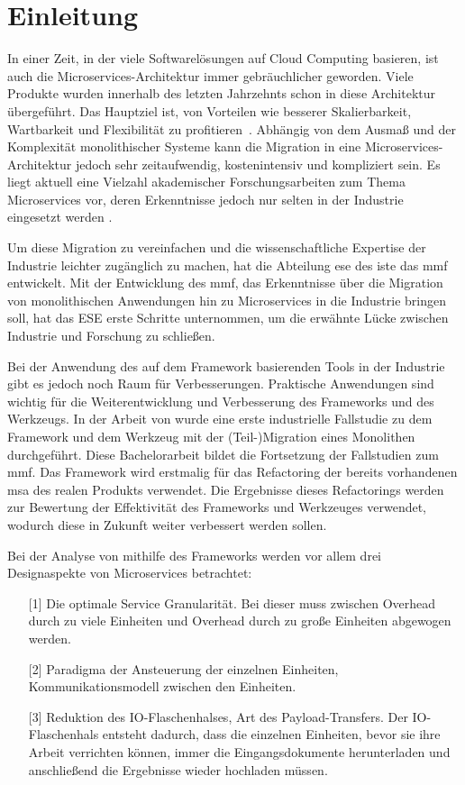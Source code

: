 \chapter{Einleitung}
\label{chap:einleitung}

In einer Zeit, in der viele Softwarelösungen auf Cloud Computing basieren, ist auch die Mi\-cro\-services-Architektur immer gebräuchlicher geworden.
Viele Produkte wurden innerhalb des letzten Jahrzehnts schon in diese Architektur übergeführt.
Das Hauptziel ist, von Vorteilen wie besserer Skalierbarkeit, Wartbarkeit und Flexibilität zu profitieren~\cite{Fritzsch_2019,taibi2017processmotivations}.
Abhängig von dem Ausmaß und der Komplexität monolithischer Systeme kann die Migration in eine Microservices-Architektur jedoch sehr zeitaufwendig, kostenintensiv und kompliziert sein.
Es liegt aktuell eine Vielzahl akademischer Forschungsarbeiten zum Thema Microservices vor, deren Erkenntnisse jedoch nur selten in der Industrie eingesetzt werden \cite{fritzsch2022architecturecentric}.

Um diese Migration zu vereinfachen und die wissenschaftliche Expertise der Industrie leichter zugänglich zu machen, hat die Abteilung \gls{ese} des \gls{iste} das \gls{mmf} entwickelt.
Mit der Entwicklung des \gls{mmf}, das Erkenntnisse über die Migration von monolithischen Anwendungen hin zu Microservices in die Industrie bringen soll, hat das ESE erste Schritte unternommen, um die erwähnte Lücke zwischen Industrie und Forschung zu schließen.

Bei der Anwendung des auf dem Framework basierenden Tools in der Industrie gibt es jedoch noch Raum für Verbesserungen.
Praktische Anwendungen sind wichtig für die Weiterentwicklung und Verbesserung des Frameworks und des Werkzeugs.
In der Arbeit von  wurde eine erste industrielle Fallstudie zu dem Framework und dem Werkzeug mit der (Teil-)Migration eines Monolithen durchgeführt.
Diese Bachelorarbeit bildet die Fortsetzung der Fallstudien zum \gls{mmf}.
Das Framework wird erstmalig für das Refactoring der bereits vorhandenen \gls{msa} des realen Produkts \jf verwendet.
Die Ergebnisse dieses Refactorings werden zur Bewertung der Effektivität des Frameworks und Werkzeuges verwendet, wodurch diese in Zukunft weiter verbessert werden sollen.

Bei der Analyse von \jf mithilfe des Frameworks werden vor allem drei Designaspekte von Microservices betrachtet:
\begin{enumerate}
	\item[{[1]}] Die optimale Service Granularität. Bei dieser muss zwischen Overhead durch zu viele Einheiten und Overhead durch zu große Einheiten abgewogen werden.
	\item[{[2]}] Paradigma der Ansteuerung der einzelnen Einheiten, Kommunikationsmodell zwischen den Einheiten.
	\item[{[3]}] Reduktion des IO-Flaschenhalses, Art des Payload-Transfers. %
	Der IO-Flaschenhals entsteht dadurch, dass die einzelnen Einheiten, bevor sie ihre Arbeit verrichten können, immer die Eingangsdokumente herunterladen und anschließend die Ergebnisse wieder hochladen müssen.
\end{enumerate}

